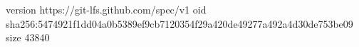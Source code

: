 version https://git-lfs.github.com/spec/v1
oid sha256:5474921f1dd04a0b5389ef9cb7120354f29a420de49277a492a4d30de753be09
size 43840
